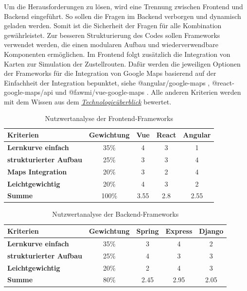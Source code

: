 \documentclass[biblatex]{lni}
\begin{document}
Um die Herausforderungen zu lösen, wird eine Trennung zwischen Frontend und Backend eingeführt.
So sollen die Fragen im Backend verborgen und dynamisch geladen werden.
Somit ist die Sicherheit der Fragen für alle Kombination gewährleistet.
Zur besseren Strukturierung des Codes sollen Frameworks verwendet werden, die einen modularen Aufbau und wiederverwendbare Komponenten ermöglichen.
Im Frontend folgt zusätzlich die Integration von Karten zur Simulation der Zustellrouten.
Dafür werden die jeweiligen Optionen der Frameworks für die Integration von Google Maps basierend auf der Einfachheit der Integration bepunktet,
siehe @angular/google-maps \cite{ngMaps}, @react-google-maps/api \cite{rctMaps} und @fawmi/vue-google-maps \cite{vueMaps}.
Alle anderen Kriterien werden mit dem Wissen aus dem \hyperref[sec:tec-überblick]{\textit{Technologieüberblick}} bewertet.

\begin{table}[h!]
  \centering
  \caption{Nutzwertanalyse der Frontend-Frameworks}
  \label{tab:nutz-frontend}
  \begin{tabular}{@{}lcccc@{}}
    \toprule
    \textbf{Kriterien} & \textbf{Gewichtung} & \textbf{Vue} & \textbf{React} & \textbf{Angular} \\ \midrule
    \textbf{Lernkurve einfach} & 35\% & 4 & 3 & 1 \\ \midrule
    \textbf{strukturierter Aufbau} & 25\% & 3 & 3 & 4 \\ \midrule
    \textbf{Maps Integration} & 20\% & 3 & 2 & 4 \\ \midrule
    \textbf{Leichtgewichtig} & 20\% & 4 & 3 & 2 \\ \midrule
    \textbf{Summe} & 100\% & 3.55 & 2.8 & 2.55 \\ \bottomrule
  \end{tabular}
\end{table}

\begin{table}[h!]
  \centering
  \caption{Nutzwertanalyse der Backend-Frameworks}
  \label{tab:nutz-backend}
  \begin{tabular}{@{}lcccc@{}}
    \toprule
    \textbf{Kriterien} & \textbf{Gewichtung} & \textbf{Spring} & \textbf{Express} & \textbf{Django} \\ \midrule
    \textbf{Lernkurve einfach} & 35\% & 3 & 4 & 2 \\ \midrule
    \textbf{strukturierter Aufbau} & 25\% & 4 & 3 & 3 \\ \midrule
    \textbf{Leichtgewichtig} & 20\% & 2 & 4 & 3 \\ \midrule
    \textbf{Summe} & 80\% & 2.45 & 2.95 & 2.05 \\ \bottomrule
  \end{tabular}
\end{table}
\end{document}
